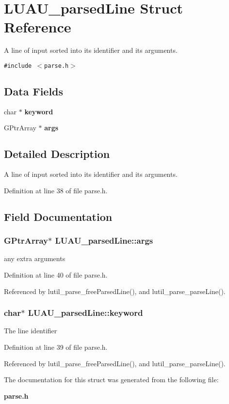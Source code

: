 \section{LUAU\_\-parsed\-Line Struct Reference}
\label{structLUAU__parsedLine}
A line of input sorted into its identifier and its arguments.  


{\tt \#include $<$parse.h$>$}

\subsection*{Data Fields}
\begin{CompactItemize}
\item 
char $\ast$ {\bf keyword}
\item 
GPtr\-Array $\ast$ {\bf args}
\end{CompactItemize}


\subsection{Detailed Description}
A line of input sorted into its identifier and its arguments. 



Definition at line 38 of file parse.h.

\subsection{Field Documentation}
\subsubsection{\setlength{\rightskip}{0pt plus 5cm}GPtr\-Array$\ast$ {\bf LUAU\_\-parsed\-Line::args}}\label{structLUAU__parsedLine_o1}


any extra arguments 

Definition at line 40 of file parse.h.

Referenced by lutil\_\-parse\_\-free\-Parsed\-Line(), and lutil\_\-parse\_\-parse\-Line().
\subsubsection{\setlength{\rightskip}{0pt plus 5cm}char$\ast$ {\bf LUAU\_\-parsed\-Line::keyword}}\label{structLUAU__parsedLine_o0}


The line identifier 

Definition at line 39 of file parse.h.

Referenced by lutil\_\-parse\_\-free\-Parsed\-Line(), and lutil\_\-parse\_\-parse\-Line().

The documentation for this struct was generated from the following file:\begin{CompactItemize}
\item 
{\bf parse.h}\end{CompactItemize}
